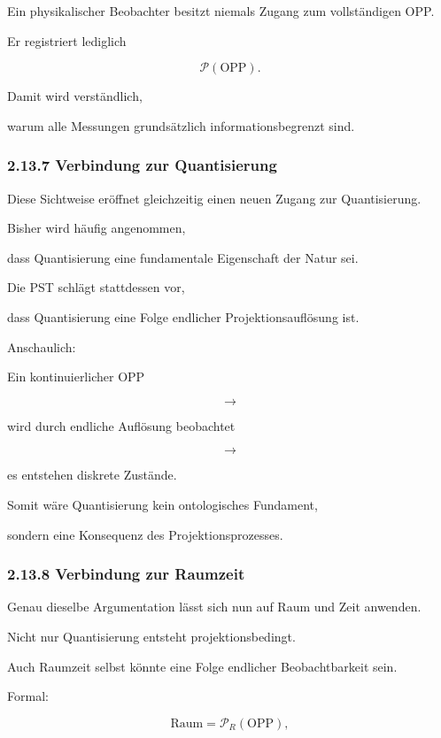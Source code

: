 Ein physikalischer Beobachter besitzt niemals Zugang zum vollständigen OPP.

Er registriert lediglich

\[
\mathcal P(\mathrm{OPP}).
\]

Damit wird verständlich,

warum alle Messungen grundsätzlich informationsbegrenzt sind.


\subsubsection*{2.13.7 Verbindung zur Quantisierung}

Diese Sichtweise eröffnet gleichzeitig einen neuen Zugang zur Quantisierung.

Bisher wird häufig angenommen,

dass Quantisierung eine fundamentale Eigenschaft der Natur sei.

Die PST schlägt stattdessen vor,

dass Quantisierung eine Folge endlicher Projektionsauflösung ist.

Anschaulich:

Ein kontinuierlicher OPP

\[
\longrightarrow
\]

wird durch endliche Auflösung beobachtet

\[
\longrightarrow
\]

es entstehen diskrete Zustände.

Somit wäre Quantisierung kein ontologisches Fundament,

sondern eine Konsequenz des Projektionsprozesses.


\subsubsection*{2.13.8 Verbindung zur Raumzeit}

Genau dieselbe Argumentation lässt sich nun auf Raum und Zeit anwenden.

Nicht nur Quantisierung entsteht projektionsbedingt.

Auch Raumzeit selbst könnte eine Folge endlicher Beobachtbarkeit sein.

Formal:

\[
\boxed{
\text{Raum}
=
\mathcal P_R(\mathrm{OPP}),
}
\]

